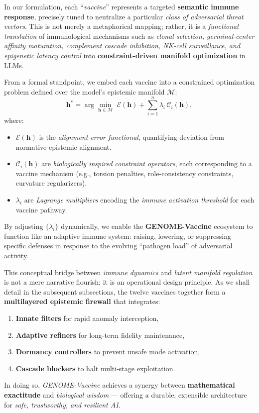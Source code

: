In our formulation, each ``\emph{vaccine}'' represents a targeted \textbf{semantic immune response}, precisely tuned to neutralize a particular \emph{class of adversarial threat vectors}. This is not merely a metaphorical mapping; rather, it is a \emph{functional translation} of immunological mechanisms such as \emph{clonal selection, germinal-center affinity maturation, complement cascade inhibition, NK-cell surveillance, and epigenetic latency control} into \textbf{constraint-driven manifold optimization} in LLMs.

From a formal standpoint, we embed each vaccine into a constrained optimization problem defined over the model’s epistemic manifold $\mathcal{M}$:
\[
\mathbf{h}^* = \arg\min_{\mathbf{h} \in \mathcal{M}} \; \mathcal{E}(\mathbf{h}) + \sum_{i=1}^n \lambda_i \, \mathcal{C}_i(\mathbf{h}),
\]
where:
\begin{itemize}
    \item $\mathcal{E}(\mathbf{h})$ is the \emph{alignment error functional}, quantifying deviation from normative epistemic alignment.
    \item $\mathcal{C}_i(\mathbf{h})$ are \emph{biologically inspired constraint operators}, each corresponding to a vaccine mechanism (e.g., torsion penalties, role-consistency constraints, curvature regularizers).
    \item $\lambda_i$ are \emph{Lagrange multipliers} encoding the \emph{immune activation threshold} for each vaccine pathway.
\end{itemize}

By adjusting $\{\lambda_i\}$ dynamically, we enable the \textbf{GENOME-Vaccine} ecosystem to function like an adaptive immune system: raising, lowering, or suppressing specific defenses in response to the evolving ``pathogen load'' of adversarial activity. 

This conceptual bridge between \emph{immune dynamics} and \emph{latent manifold regulation} is not a mere narrative flourish; it is an operational design principle. As we shall detail in the subsequent subsections, the twelve vaccines together form a \textbf{multilayered epistemic firewall} that integrates:
\begin{enumerate}
    \item \textbf{Innate filters} for rapid anomaly interception,
    \item \textbf{Adaptive refiners} for long-term fidelity maintenance,
    \item \textbf{Dormancy controllers} to prevent unsafe mode activation,
    \item \textbf{Cascade blockers} to halt multi-stage exploitation.
\end{enumerate}
In doing so, \emph{GENOME-Vaccine} achieves a synergy between \textbf{mathematical exactitude} and \emph{biological wisdom} --- offering a durable, extensible architecture for \emph{safe, trustworthy, and resilient AI}.


